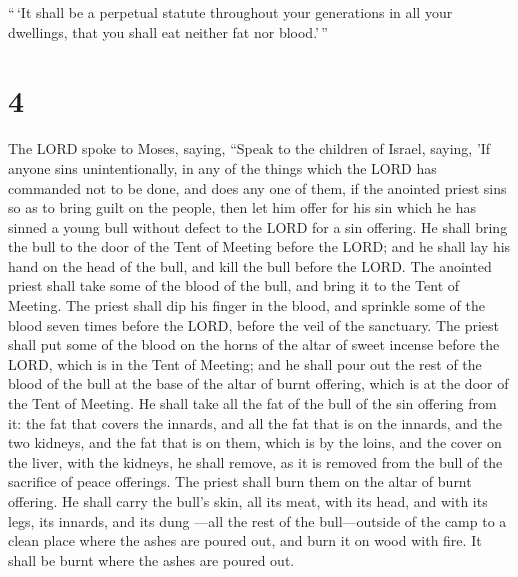  ``\,`It shall be a perpetual statute throughout your
generations in all your dwellings, that you shall eat neither fat nor
blood.'\,''

\hypertarget{section-3}{%
\section{4}\label{section-3}}

 The LORD spoke to Moses, saying,  ``Speak
to the children of Israel, saying, 'If anyone sins unintentionally, in
any of the things which the LORD has commanded not to be done, and does
any one of them,  if the anointed priest sins so as to
bring guilt on the people, then let him offer for his sin which he has
sinned a young bull without defect to the LORD for a sin offering.
 He shall bring the bull to the door of the Tent of
Meeting before the LORD; and he shall lay his hand on the head of the
bull, and kill the bull before the LORD.  The anointed
priest shall take some of the blood of the bull, and bring it to the
Tent of Meeting.  The priest shall dip his finger in the
blood, and sprinkle some of the blood seven times before the LORD,
before the veil of the sanctuary.  The priest shall put
some of the blood on the horns of the altar of sweet incense before the
LORD, which is in the Tent of Meeting; and he shall pour out the rest of
the blood of the bull at the base of the altar of burnt offering, which
is at the door of the Tent of Meeting.  He shall take all
the fat of the bull of the sin offering from it: the fat that covers the
innards, and all the fat that is on the innards,  and the
two kidneys, and the fat that is on them, which is by the loins, and the
cover on the liver, with the kidneys, he shall remove, 
as it is removed from the bull of the sacrifice of peace offerings. The
priest shall burn them on the altar of burnt offering. 
He shall carry the bull's skin, all its meat, with its head, and with
its legs, its innards, and its dung  ---all the rest of
the bull---outside of the camp to a clean place where the ashes are
poured out, and burn it on wood with fire. It shall be burnt where the
ashes are poured out.

